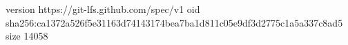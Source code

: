 version https://git-lfs.github.com/spec/v1
oid sha256:ca1372a526f5e31163d74143174bea7ba1d811c05e9df3d2775c1a5a337c8ad5
size 14058
